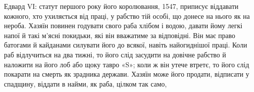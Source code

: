 Едвард VI: статут першого року його королювання, 1547,
приписує віддавати кожного, хто ухиляється від праці, у рабство
тій особі, що донесе на нього як на нероба. Хазяїн повинен годувати
свого раба хлібом і водою, давати йому легкі напої й такі
м’ясні покидьки, які він вважатиме за відповідні. Він має право
батогами й кайданами силувати його до всякої, навіть найогиднішої
праці. Коли раб відлучиться на два тижні, то його слід
засудити на довічне рабство й наложити на його лоб або щоку
тавро «S»; коли ж він утече втретє, то його слід покарати на
смерть як зрадника держави. Хазяїн може його продати, відписати
у спадщину, віддати в найми, як раба, цілком так само,
\parbreak{}  %
